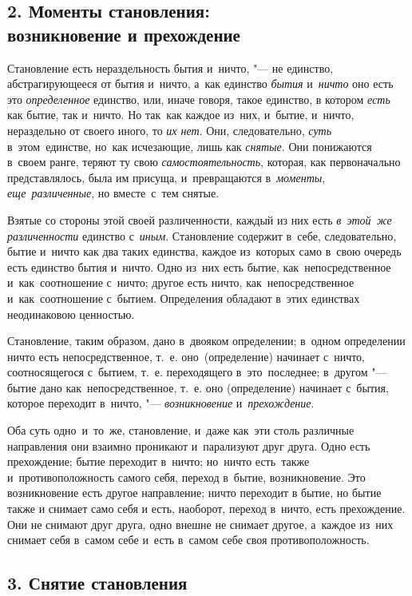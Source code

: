 \subsection%
[2. Моменты становления: возникновение и прехождение]%
{2. Моменты становления:\\возникновение и прехождение}

Становление есть нераздельность бытия и~ничто, "--- не единство,
абстрагирующееся от бытия и~ничто, а~как единство {\em бытия} и~{\em ничто} оно
есть это {\em определенное} единство, или, иначе говоря, такое единство, в
котором {\em есть} как бытие, так и~ничто. Но так~как каждое из~них, и~бытие,
и~ничто, нераздельно от своего иного, то {\em их нет}. Они, следовательно,
{\em суть} в~этом~единстве, но~как исчезающие, лишь как {\em снятые}. Они
понижаются в~своем ранге, теряют ту свою {\em самостоятельность}, которая, как
первоначально представлялось, была им присуща, и~превращаются в~{\em моменты},
{\em еще~различенные}, но вместе~с~тем снятые.

Взятые со стороны этой своей различенности, каждый из них есть
{\em в~этой~же различенности} единство с~{\em иным}. Становление содержит
в~себе, следовательно, бытие и~ничто как два таких единства, каждое из~которых
само в~свою очередь есть единство бытия и~ничто. Одно из~них есть бытие,
как~непосредственное и~как~соотношение с~ничто; другое есть ничто,
как~непосредственное и~как~соотношение с~бытием. Определения обладают в~этих
единствах неодинаковою ценностью.

Становление, таким образом, дано в~двояком определении; в~одном определении
ничто есть непосредственное, т.~е. оно~(определение) начинает с~ничто,
соотносящегося с~бытием, т.~е. переходящего в~это~последнее; в~другом "---
бытие дано как~непосредственное, т.~е. оно (определение) начинает с~бытия,
которое переходит в~ничто, "--- {\em возникновение} и~{\em прехождение}.

Оба суть одно~и~то~же, становление, и~даже как~эти столь различные направления
они взаимно проникают и~парализуют друг друга. Одно есть прехождение; бытие
переходит в~ничто; но~ничто есть~также и~противоположность самого себя, переход
в~бытие, возникновение. Это возникновение есть другое направление; ничто
переходит в бытие, но бытие также и снимает само себя и есть, наоборот, переход
в~ничто, есть прехождение. Они не снимают друг друга, одно внешне не снимает
другое, а~каждое из~них снимает себя в~самом себе и~есть в~самом себе своя
противоположность.

\subsection[3. Снятие становления]{3. Снятие становления}

